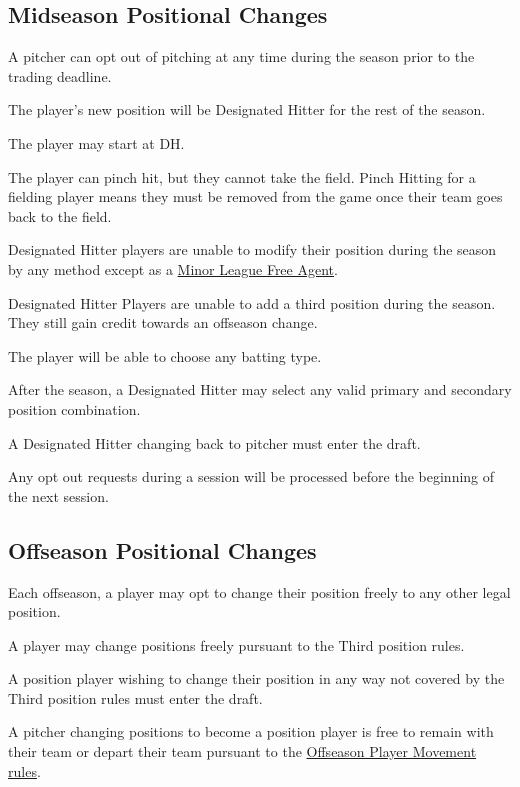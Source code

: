 \subsection{Midseason Positional Changes}
\begin{deepEnumerate}
	\item A pitcher can opt out of pitching at any time during the season prior to the trading deadline.
	\begin{deepEnumerate}
		\item The player's new position will be Designated Hitter for the rest of the season.
		\begin{deepEnumerate}
			\item The player may start at DH.
			\item The player can pinch hit, but they cannot take the field. Pinch Hitting for a fielding player means they must be removed from the game 
			once their team goes back to the field.
			\item Designated Hitter players are unable to modify their position during the season by any method except as a \hyperref[sec:MiLR FA]{Minor League Free Agent}.
			\item Designated Hitter Players are unable to add a third position during the season. They still gain credit towards an offseason change.
		\end{deepEnumerate}
		\item The player will be able to choose any batting type.
		\item After the season, a Designated Hitter may select any valid primary and secondary position combination.
		\begin{deepEnumerate}
			\item A Designated Hitter changing back to pitcher must enter the draft.
		\end{deepEnumerate}
		\item Any opt out requests during a session will be processed before the beginning of the next session.
	\end{deepEnumerate}
\end{deepEnumerate}

\subsection{Offseason Positional Changes}
\label{sec:OPC}
\begin{deepEnumerate}
	\item Each offseason, a player may opt to change their position freely to any other legal position.
	\item A player may change positions freely pursuant to the Third position rules.
	\item A position player wishing to change their position in any way not covered by the Third position rules must enter the draft.
	\item A pitcher changing positions to become a position player is free to remain with their team or depart their team pursuant to the
	\hyperref[sec:OPM]{Offseason Player Movement rules}.
\end{deepEnumerate}

